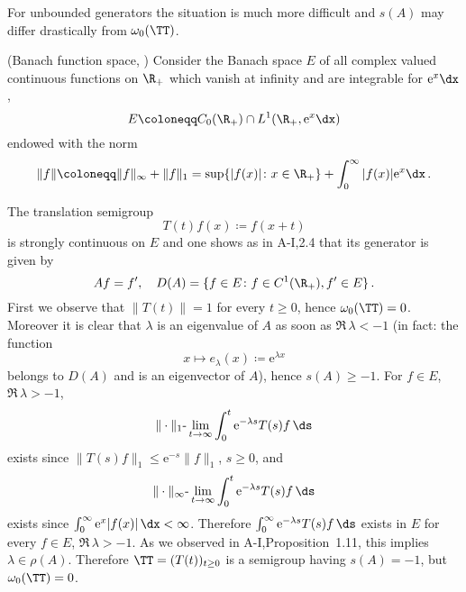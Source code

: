 For unbounded generators the situation is much more difficult and $s(A)$ may differ drastically from $\omega_{0}(\TT)$.
\begin{example}\label{ex:a3-1.3}
(Banach function space, \citet{greinervoigtwolff:1981})
Consider the Banach space $E$ of all complex valued continuous functions on $\R_{+}$ which vanish at infinity and are integrable for $\mathrm{e}^{x}\dx$, \ie 
\[
    E \coloneqq C_{0}(\R_{+}) \cap L^{1}(\R_{+}, \mathrm{e}^{x}\dx)
\]
endowed with the norm
\[
    \|f\| \coloneqq \|f\|_{\infty} + \|f\|_{1} = \sup\{|f(x)| \colon x \in \R_{+}\} + \int_{0}^{\infty} |f(x)|\mathrm{e}^{x} \dx\,.
\]
\end{example}
The translation semigroup
\[
    T(t)f(x) \coloneqq f(x+t)
\]
is strongly continuous on $E$ and one shows as in A-I,2.4 that its generator is given by
\[
    Af = f', \quad D(A) = \{ f \in E \colon f \in C^{1}(\R_{+}), f' \in E \}\,.
\]
First we observe that $\|T(t)\| = 1$ for every $t \geq 0$, hence $\omega_{0}(\TT) = 0$.
Moreover it is clear that $\lambda$ is an eigenvalue of $A$ as soon as $\Re\,\lambda < -1$ (in fact: the function
\[
    x \mapsto e_{\lambda}(x) \coloneqq \mathrm{e}^{\lambda x}
\]
belongs to $D(A)$ and is an eigenvector of $A$), hence $s(A) \geq -1$.
For $f \in E$, $\Re\,\lambda > -1$,
\[
    \|\cdot\|_{1}\text{-}\lim_{t \to \infty} \int_{0}^{t} \mathrm{e}^{-\lambda s}T(s)f \, \ds
\]
exists since $\|T(s)f\|_{1} \leq \mathrm{e}^{-s}\|f\|_{1}$, $s \geq 0$, and
\[
    \|\cdot\|_{\infty}\text{-}\lim_{t \to \infty} \int_{0}^{t} \mathrm{e}^{-\lambda s}T(s)f \, \ds
\]
exists since $\int_{0}^{\infty} \mathrm{e}^{x}|f(x)| \, \dx < \infty$.
Therefore $\int_{0}^{\infty} \mathrm{e}^{-\lambda s}T(s)f \, \ds$ exists in $E$ for every $f \in E$, $\Re\,\lambda > -1$.
As we observed in A-I,Proposition~1.11, this implies $\lambda \in \rho(A)$.
Therefore $\TT = (T(t))_{t\geq 0}$ is a semigroup having $s(A) = -1$, but $\omega_{0}(\TT) = 0$.
